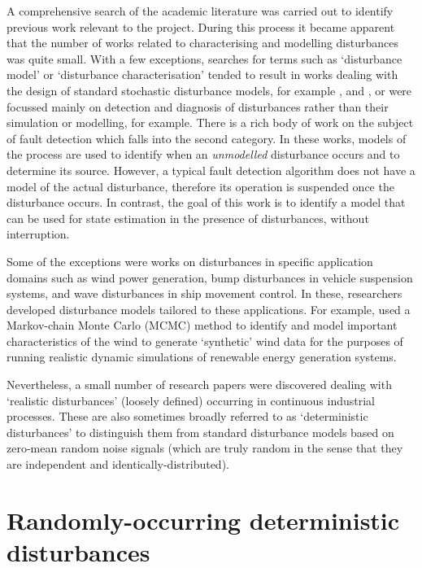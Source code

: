 A comprehensive search of the academic literature was carried out to identify previous work relevant to the project. During this process it became apparent that the number of works related to characterising and modelling disturbances was quite small. With a few exceptions, searches for terms such as `disturbance model' or `disturbance characterisation' tended to result in works dealing with the design of standard stochastic disturbance models, for example \cite{muske_badgwell_disturbance_2002}, and \cite{pannocchia_robust_2003}, or were focussed mainly on detection and diagnosis of disturbances rather than their simulation or modelling, \cite{thornhill_advances_2007} for example. There is a rich body of work on the subject of fault detection which falls into the second category. In these works, models of the process are used to identify when an \textit{unmodelled} disturbance occurs and to determine its source. However, a typical fault detection algorithm does not have a model of the actual disturbance, therefore its operation is suspended once the disturbance occurs. In contrast, the goal of this work is to identify a model that can be used for state estimation in the presence of disturbances, without interruption.

Some of the exceptions were works on disturbances in specific application domains such as wind power generation, bump disturbances in vehicle suspension systems, and wave disturbances in ship movement control.  In these, researchers developed disturbance models tailored to these applications. For example, \cite{papaefthymiou_mcmc_2008} used a Markov-chain Monte Carlo (MCMC) method to identify and model important characteristics of the wind to generate `synthetic' wind data for the purposes of running realistic dynamic simulations of renewable energy generation systems.

Nevertheless, a small number of research papers were discovered dealing with `realistic disturbances' (loosely defined) occurring in continuous industrial processes. These are also sometimes broadly referred to as `deterministic disturbances' to distinguish them from standard disturbance models based on zero-mean random noise signals (which are truly random in the sense that they are independent and identically-distributed).

\section*{Randomly-occurring deterministic disturbances} \label{RODDs}

